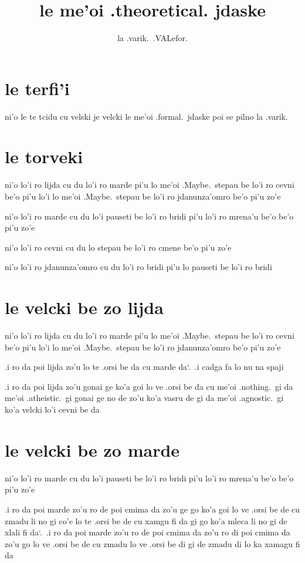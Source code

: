 \documentclass{report}
\title{le me'oi .theoretical. jdaske}
\author{la .varik.\ .VALefor.}
\newcommand\sds{\spacefactor\sfcode`.\ \space}
\newcommand\lijdyvelcki{lo'i ro lijda cu du lo'i ro marde pi'u lo me'oi .Maybe.\ stepau be lo'i ro cevni be'o pi'u lo'i lo me'oi .Maybe.\ stepau be lo'i ro jdanunza'omro be'o pi'u zo'e}
\newcommand\mardyvelcki{lo'i ro marde cu du lo'i pauseti be lo'i ro bridi pi'u lo'i ro mrena'u be'o be'o pi'u zo'e}
\newcommand\cevnyvelcki{lo'i ro cevni cu du lo stepau be lo'i ro cmene be'o pi'u zo'e}
\newcommand\jdanunzahomrovelcki{lo'i ro jdanunza'omro cu du lo'i ro bridi pi'u lo pauseti be lo'i ro bridi}
\begin{document}
\maketitle{}
\tableofcontents{}
\chapter{le terfi'i}
ni'o le te tcidu cu velski je velcki le me'oi .formal.\ jdaske poi se pilno la .varik.

\chapter{le torveki}
ni'o \lijdyvelcki

ni'o \mardyvelcki

ni'o \cevnyvelcki

ni'o \jdanunzahomrovelcki

\chapter{le velcki be zo lijda}
ni'o \lijdyvelcki

.i ro da poi lijda zo'u lo te .orsi be da cu marde da\sds  .i cadga fa lo nu na spaji

.i ro da poi lijda zo'u gonai ge ko'a goi lo ve .orsi be da cu me'oi .nothing.\ gi da me'oi .atheistic.\ gi gonai ge no de zo'u ko'a vasru de gi da me'oi .agnostic.\ gi ko'a velcki lo'i cevni be da

\chapter{le velcki be zo marde}
ni'o \mardyvelcki

.i ro da poi marde zo'u ro de poi cmima da zo'u ge go ko'a goi lo ve .orsi be de cu zmadu li no gi co'e lo te .orsi be de cu xamgu fi da gi go ko'a mleca li no gi de xlali fi da\sds .i ro da poi marde zo'u ro de poi cmima da zo'u ro di poi cmima da zo'u go lo ve .orsi be de cu zmadu lo ve .orsi be di gi de zmadu di lo ka xamagu fi da
\end{document}

